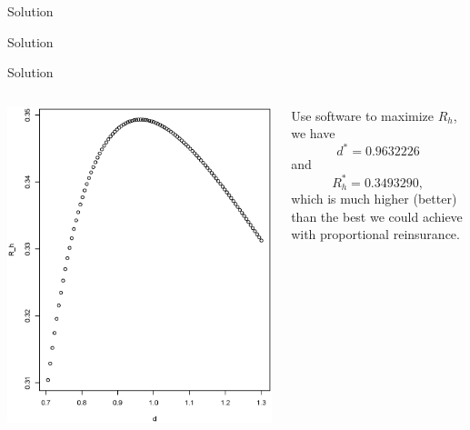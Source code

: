\documentclass[11pt]{beamer}
\begin{document}
\begin{frame}{Solution}

\end{frame}
\begin{frame}{Solution}

\end{frame}
\begin{frame}{Solution}

\begin{columns}

\includegraphics[scale=0.3]{Example2}

Use software to maximize $R_h$, we have
$$d^*=0.9632226$$
and
$$R_h^*=0.3493290,$$
which is much higher (better) than the best we could achieve with proportional reinsurance.
\end{columns}

\end{frame}
\end{document}
